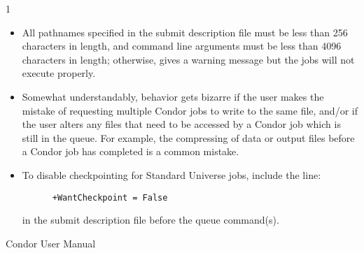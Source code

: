 \begin{ManPage}{\label{man-condor-submit}}{1}
\begin{itemize}
\item All pathnames specified in the submit description file must be
less than 256 characters in length, and command line arguments must be
less than 4096 characters in length; otherwise,  gives a
warning message but the jobs will not execute properly. 

\item Somewhat understandably, behavior gets bizarre if the user makes
the mistake of requesting multiple Condor jobs to write to the
same file, and/or if the user alters any files that need to be accessed
by a Condor job which is still in the queue.
For example, the compressing of data or
output files before a Condor job has completed is a common mistake.

\item To disable checkpointing for Standard Universe jobs, include the
line:
\begin{verbatim}
      +WantCheckpoint = False
\end{verbatim}
in the submit description file before the queue command(s).
\end{itemize}

\SeeAlso
Condor User Manual

\end{ManPage}


